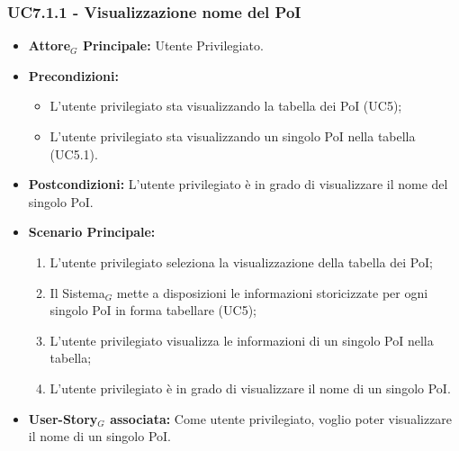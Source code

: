 \documentclass[10pt]{article}
\begin{document}
\begin{justify}
\subsubsection{\textbf{UC7.1.1 - Visualizzazione nome del PoI}}
\label{UC7.1.1}
\begin{itemize}
    \item \textbf{Attore$_G$ Principale:} Utente Privilegiato.
    \item \textbf{Precondizioni:} 
        \begin{itemize}
          \item L'utente privilegiato sta visualizzando la tabella dei PoI (UC5);
            \item L'utente privilegiato sta visualizzando un singolo PoI nella tabella (UC5.1).
        \end{itemize}
      \item \textbf{Postcondizioni:} L'utente privilegiato è in grado di visualizzare il nome del singolo PoI.
    \item \textbf{Scenario Principale:} 
        \begin{enumerate}
        \item L'utente privilegiato seleziona la visualizzazione della tabella dei PoI;
          \item Il Sistema$_G$ mette a disposizioni le informazioni storicizzate per ogni singolo PoI in forma tabellare (UC5);
          \item L'utente privilegiato visualizza le informazioni di un singolo PoI nella tabella;
            \item L'utente privilegiato è in grado di visualizzare il nome di un singolo PoI.
        \end{enumerate}
    \item \textbf{User-Story$_G$ associata:} Come utente privilegiato, voglio poter visualizzare il nome di un singolo PoI.
\end{itemize}


\end{justify}
\end{document}
